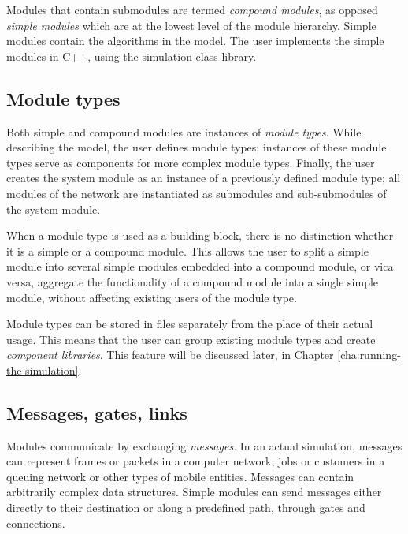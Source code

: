 Modules that contain submodules are termed \textit{compound
  modules}, as opposed \textit{simple
  modules} which are at the lowest level of the
module hierarchy. Simple modules contain the algorithms in the model.
The user implements the simple modules in C++, using the {\opp}
simulation class library.


\subsection{Module types}

Both simple and compound modules are instances of \textit{module
  types}. While describing the model, the user defines module types;
instances of these module types serve as components for more complex
module types. Finally, the user creates the system module as an
instance of a previously defined module type; all modules of the
network are instantiated as submodules and sub-submodules of the
system module.


When a module type is used as a building block, there is no
distinction whether it is a simple or a compound module. This allows
the user to split a simple module into several
simple modules embedded into a compound module,
or vica versa, aggregate the functionality of a compound module into a
single simple module, without affecting existing users of the module
type.


Module types can be stored in files separately from the place 
of their actual usage. This means that the user can group existing 
module types and create \textit{component libraries}. This feature 
will be discussed later, in Chapter \ref{cha:running-the-simulation}.



\subsection{Messages, gates, links}

Modules communicate by exchanging
\textit{messages}. In an actual simulation,
messages can represent frames or packets in a computer network, jobs
or customers in a queuing network or other types of mobile entities.
Messages can contain arbitrarily complex data structures. Simple
modules can send messages either directly to their destination or
along a predefined path, through gates and connections.


